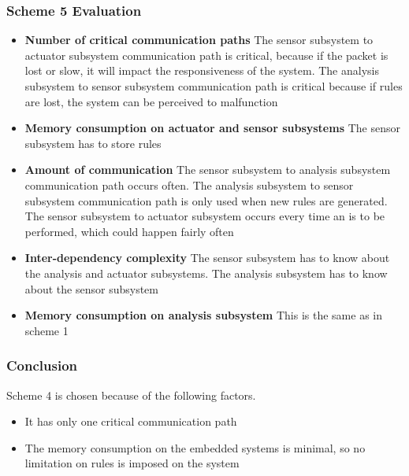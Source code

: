 \subsubsection{Scheme 5 Evaluation}
\begin{itemize}
\item \textbf{Number of critical communication paths} The sensor subsystem to actuator subsystem communication path is critical, because if the packet is lost or slow, it will impact the responsiveness of the system. The analysis subsystem to sensor subsystem communication path is critical because if rules are lost, the system can be perceived to malfunction
\item \textbf{Memory consumption on actuator and sensor subsystems} The sensor subsystem has to store rules
\item \textbf{Amount of communication} The sensor subsystem to analysis subsystem communication path occurs often. The analysis subsystem to sensor subsystem communication path is only used when new rules are generated. The sensor subsystem to actuator subsystem occurs every time an is to be performed, which could happen fairly often
\item \textbf{Inter-dependency complexity} The sensor subsystem has to know about the analysis and actuator subsystems. The analysis subsystem has to know about the sensor subsystem
\item \textbf{Memory consumption on analysis subsystem} This is the same as in scheme 1
\end{itemize}

\subsubsection{Conclusion}
Scheme 4 is chosen because of the following factors.
\begin{itemize}
\item It has only one critical communication path
\item The memory consumption on the embedded systems is minimal, so no limitation on rules is imposed on the system
\end{itemize}


